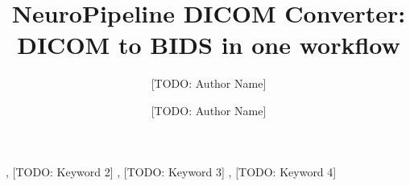 \documentclass[preprint,12pt]{elsarticle}
\begin{document}
\begin{frontmatter}

\title{NeuroPipeline DICOM Converter: DICOM to BIDS in one workflow}

\author[author1]{[TODO: Author Name]}
\author[author2]{[TODO: Author Name]}

\address[author1]{[TODO: Affiliation 1]}
\address[author2]{[TODO: Affiliation 2]}

\begin{abstract}

\end{abstract}

\begin{keyword}
 \sep
[TODO: Keyword 2] \sep
[TODO: Keyword 3] \sep
[TODO: Keyword 4]
\end{keyword}

\end{frontmatter}






















%
% 
% 
\end{document}
